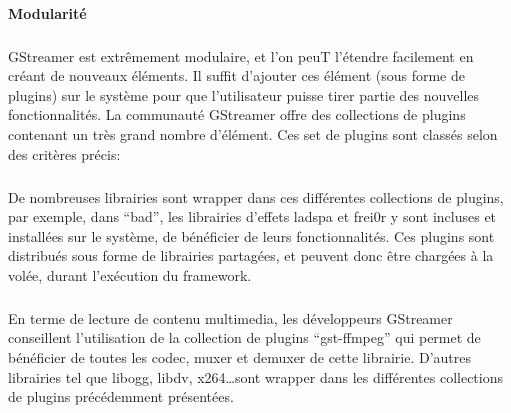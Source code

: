 {\paragraph {Modularité}

\subparagraph{}

GStreamer est extrêmement modulaire, et l'on peuT l'étendre facilement
en créant de nouveaux éléments. Il suffit d'ajouter ces élément (sous
forme de plugins) sur le système pour que l'utilisateur puisse tirer
partie des nouvelles fonctionnalités. La communauté GStreamer offre des
collections de plugins contenant un très grand nombre d'élément. Ces
set de plugins sont classés selon des critères précis:


\subparagraph{}

De nombreuses librairies sont wrapper dans ces différentes collections de plugins, par exemple, dans ``bad'', les librairies d'effets ladspa
et frei0r y sont incluses et %
installées sur le système, %
de bénéficier de leurs fonctionnalités.  Ces plugins sont distribués
sous forme de librairies partagées, et peuvent donc être chargées à la
volée, durant l'exécution du framework.

\subparagraph{}

En terme de lecture de contenu multimedia, les développeurs GStreamer
conseillent l'utilisation de la collection de plugins ``gst-ffmpeg''
qui permet de bénéficier de toutes les codec, muxer et demuxer de cette
librairie. D'autres librairies tel que libogg, libdv, x264\ldots sont
wrapper dans les différentes collections de plugins précédemment
présentées.

}
